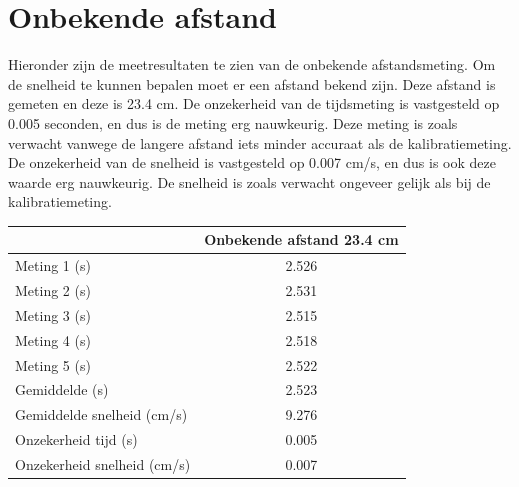 \documentclass{thema}
\begin{document}
\section{Onbekende afstand}
Hieronder zijn de meetresultaten te zien van de onbekende afstandsmeting. Om de snelheid te kunnen bepalen moet er een afstand bekend zijn. Deze afstand is gemeten en deze is 23.4 cm. De onzekerheid van de tijdsmeting is vastgesteld op 0.005 seconden, en dus is de meting erg nauwkeurig. Deze meting is zoals verwacht vanwege de langere afstand iets minder accuraat als de kalibratiemeting. De onzekerheid van de snelheid is vastgesteld op 0.007 cm/s, en dus is ook deze waarde erg nauwkeurig. De snelheid is zoals verwacht ongeveer gelijk als bij de kalibratiemeting.
\begin{center}
\begin{tabular}{| l| c|}
\hline
    & Onbekende afstand 23.4 cm\\
\hline
   Meting 1 (s) & 2.526 \\
\hline
   Meting 2 (s) & 2.531 \\
\hline
   Meting 3 (s) & 2.515 \\
\hline
   Meting 4 (s) & 2.518 \\
\hline
   Meting 5 (s) & 2.522 \\
\hline
   Gemiddelde (s) & 2.523 \\
\hline
   Gemiddelde snelheid (cm/s) & 9.276 \\
\hline
   Onzekerheid tijd (s) & 0.005 \\
\hline
   Onzekerheid snelheid (cm/s) & 0.007 \\
\hline
 \end{tabular}
\end{center}
\end{document}
